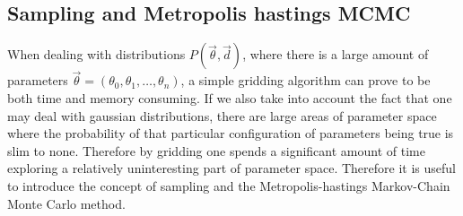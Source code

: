 \subsection{Sampling and Metropolis hastings MCMC}
When dealing with distributions $P(\vec{\theta},\vec{d})$, where there is a
large amount of parameters $\vec{\theta}=(\theta_0, \theta_1,\dots, \theta_n)$,
a simple gridding algorithm can prove to be both time and memory consuming. If
we also take into account the fact that one may deal with gaussian
distributions, there are large areas of parameter space where the probability of
that particular configuration of parameters being true is slim to none.
Therefore by gridding one spends a significant amount of time exploring a relatively
uninteresting part of parameter space. Therefore it is useful to introduce the
concept of sampling and the Metropolis-hastings Markov-Chain Monte Carlo
method.\\

